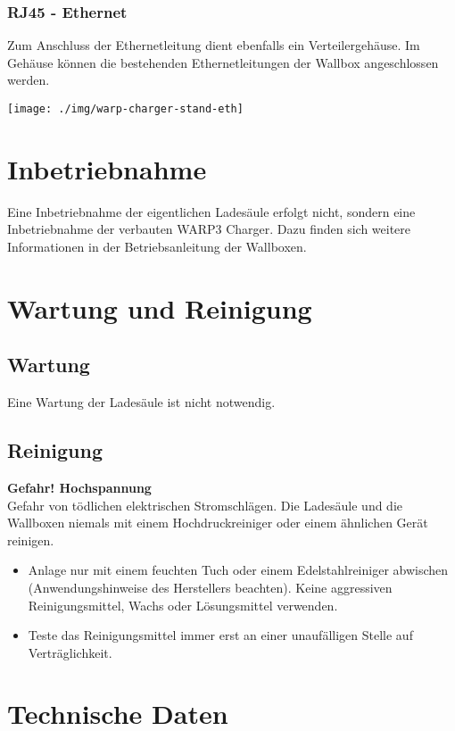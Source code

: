 \documentclass[a4paper,10pt]{article}
\newcommand{\warn}[1]{\begin{tcolorbox}[colback=boxred,colframe=red,coltext=
white,title=Warnung]#1\end{tcolorbox}}
\begin{document}
\begin{multicols*}{2}
	\subsubsection{RJ45 - Ethernet}
	Zum Anschluss der Ethernetleitung dient ebenfalls ein Verteilergehäuse.
	Im Gehäuse können die bestehenden Ethernetleitungen der Wallbox
	angeschlossen werden.

	\begin{center}
		\texttt{[image: ./img/warp-charger-stand-eth]}
	\end{center}

	\section{Inbetriebnahme}
	Eine Inbetriebnahme der eigentlichen Ladesäule erfolgt nicht, sondern eine 
	Inbetriebnahme der verbauten WARP3 Charger. Dazu finden sich weitere Informationen in der
	Betriebsanleitung der Wallboxen.

	\section{Wartung und Reinigung}
	\subsection{Wartung}
	Eine Wartung der Ladesäule ist nicht notwendig.

	\subsection{Reinigung}
	\warn{\textbf{Gefahr! Hochspannung}\\Gefahr von tödlichen elektrischen
	Stromschlägen. Die Ladesäule und die Wallboxen niemals mit einem Hochdruckreiniger oder einem ähnlichen Gerät reinigen.}
	\begin{itemize}
		\item Anlage nur mit einem feuchten Tuch oder einem Edelstahlreiniger abwischen (Anwendungshinweise des Herstellers beachten). Keine aggressiven Reinigungsmittel, Wachs oder Lösungsmittel verwenden.
		\item Teste das Reinigungsmittel immer erst an einer unaufälligen Stelle auf Verträglichkeit.
	\end{itemize}

	\section{Technische Daten}


\end{multicols*}
\end{document}
